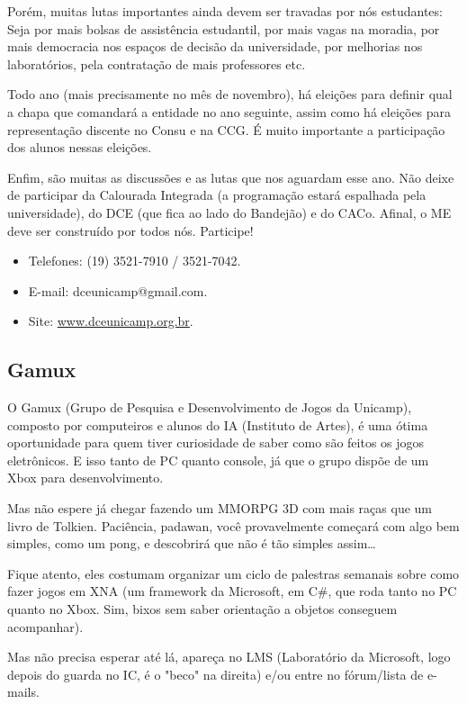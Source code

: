 Porém, muitas lutas importantes ainda devem ser travadas por nós estudantes:
Seja por mais bolsas de assistência estudantil, por mais vagas na moradia, por
mais democracia nos espaços de decisão da universidade, por melhorias nos
laboratórios, pela contratação de mais professores etc.

Todo ano (mais precisamente no mês de novembro), há eleições para definir qual
a chapa que comandará a entidade no ano seguinte, assim como há eleições para
representação discente no Consu e na CCG. É muito importante a participação dos
alunos nessas eleições.

Enfim, são muitas as discussões e as lutas que nos aguardam esse ano. Não deixe
de participar da Calourada Integrada (a programação estará espalhada pela
universidade), do DCE (que fica ao lado do Bandejão) e do CACo. Afinal, o ME
deve ser construído por todos nós. Participe!

\begin{itemize}
\item  Telefones: (19) 3521-7910 / 3521-7042.
\item  E-mail: dceunicamp@gmail.com.
\item  Site: \url{www.dceunicamp.org.br}.
\end{itemize}

\subsection{Gamux}

O Gamux (Grupo de Pesquisa e Desenvolvimento de Jogos da Unicamp), composto por
computeiros e alunos do IA (Instituto de Artes), é uma ótima oportunidade para
quem tiver curiosidade de saber como são feitos os jogos eletrônicos. E isso
tanto de PC quanto console, já que o grupo dispõe de um Xbox para
desenvolvimento.

Mas não espere já chegar fazendo um MMORPG 3D com mais raças que um livro de
Tolkien. Paciência, padawan, você provavelmente começará com algo bem simples,
como um pong, e descobrirá que não é tão simples assim{\dots}

Fique atento, eles costumam organizar um ciclo de palestras semanais sobre como
fazer jogos em XNA (um framework da Microsoft, em C\#, que roda tanto no PC
quanto no Xbox. Sim, bixos sem saber orientação a objetos conseguem acompanhar).

Mas não precisa esperar até lá, apareça no LMS (Laboratório da Microsoft, logo
depois do guarda no IC, é o "beco" na direita) e/ou entre no fórum/lista de
e-mails.

